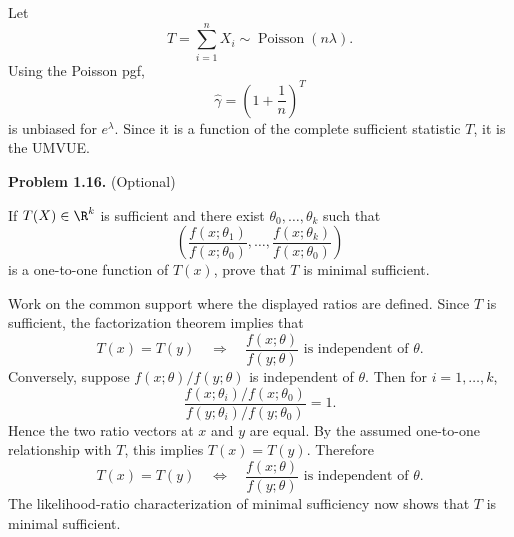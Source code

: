 \documentclass[answers,12pt,addpoints]{exam}
\begin{document}
\begin{questions}
\begin{solution}
Let
\[
T=\sum_{i=1}^nX_i\sim\operatorname{Poisson}(n\lambda).
\]
Using the Poisson pgf,
\[
\widehat\gamma=\left(1+\frac1n\right)^T
\]
is unbiased for $e^\lambda$. Since it is a function of the complete sufficient
statistic $T$, it is the UMVUE.

\end{solution}

\question[0] \textbf{Problem 1.16.} (Optional)

If $T(X)\in\R^k$ is sufficient and there exist
$\theta_0,\ldots,\theta_k$ such that
\[
\left(
\frac{f(x;\theta_1)}{f(x;\theta_0)},\ldots,
\frac{f(x;\theta_k)}{f(x;\theta_0)}
\right)
\]
is a one-to-one function of $T(x)$, prove that $T$ is minimal sufficient.

\begin{solution}
Work on the common support where the displayed ratios are defined. Since $T$ is
sufficient, the factorization theorem implies that
\[
T(x)=T(y)
\quad\Longrightarrow\quad
\frac{f(x;\theta)}{f(y;\theta)}
\text{ is independent of }\theta.
\]
Conversely, suppose $f(x;\theta)/f(y;\theta)$ is independent of $\theta$. Then for
$i=1,\ldots,k$,
\[
\frac{f(x;\theta_i)/f(x;\theta_0)}
{f(y;\theta_i)/f(y;\theta_0)}=1.
\]
Hence the two ratio vectors at $x$ and $y$ are equal. By the assumed one-to-one
relationship with $T$, this implies $T(x)=T(y)$. Therefore
\[
T(x)=T(y)
\quad\Longleftrightarrow\quad
\frac{f(x;\theta)}{f(y;\theta)}
\text{ is independent of }\theta.
\]
The likelihood-ratio characterization of minimal sufficiency now shows that $T$ is
minimal sufficient.
\end{solution}


\end{questions}
\end{document}

